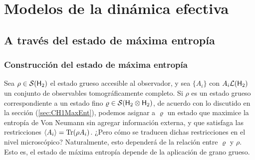 \chapter{Modelos de la dinámica efectiva}

\section{A través del estado de máxima entropía}


\subsection{Construcción del estado de máxima entropía}

Sea $\rho\in\mathcal{S}({\sf H}_{2})$ el estado grueso accesible al observador, y sea $\{A_{i}\}$ con $A_{i}\mathcal{L}({\sf H}_{2})$ un conjunto de observables tomográficamente completo. Si $\rho$ es un estado grueso correspondiente a un estado fino $\varrho\in\mathcal{S}({\sf H}_{2}\otimes{\sf H}_{2})$, de acuerdo con lo discutido en la sección (\ref{sec:CH1MaxEnt}), podemos asignar a $\varrho$ un estado que maximice la entropía de Von Neumann sin agregar información externa, y que satisfaga las restricciones $\expval{A_{i}}=\Tr(\rho A_{i})$. ¿Pero cómo se traducen dichas restricciones en el nivel microscópico? Naturalmente, esto dependerá de la relación entre $\varrho$ y $\rho$. Esto es, el estado de máxima entropía depende de la aplicación de grano grueso.

